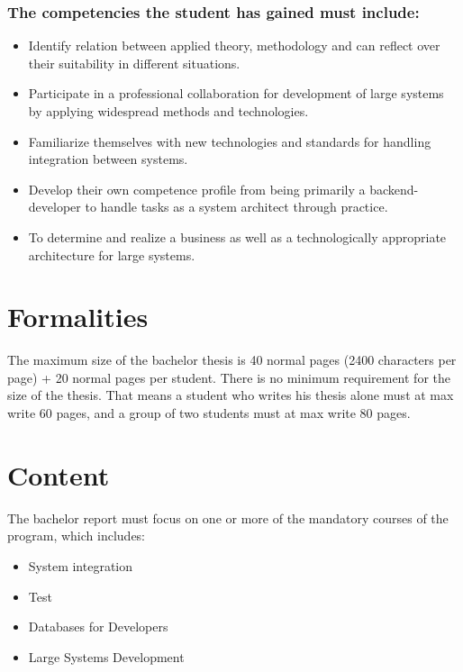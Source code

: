 \documentclass{article}
\begin{document}
\subsubsection{The competencies the student has gained must include: }
\begin{itemize}
	\item Identify relation between applied theory, methodology and can reflect over their suitability in different situations. 
	\item Participate in a professional collaboration for development of large systems by applying widespread methods and technologies. 
	\item Familiarize themselves with new technologies and standards for handling integration between systems.
	\item Develop their own competence profile from being primarily a backend-developer to handle tasks as a system architect through practice.
	\item To determine and realize a business as well as a technologically appropriate architecture for large systems.
\end{itemize} \cite[my translation]{curriculum}
\section{Formalities}
The maximum size of the bachelor thesis is 40 normal pages (2400 characters per page) + 20 normal pages per student. There is no minimum requirement for the size of the thesis.\cite{formalities}  That means a student who writes his thesis alone must at max write 60 pages, and a group of two students must at max write 80 pages.

\section{Content}
The bachelor report must focus on one or more of the mandatory courses of the program, which includes: 
\begin{itemize}
	\item System integration
	\item Test
	\item Databases for Developers
	\item Large Systems Development
\end{itemize}\cite{content}



\end{document}
